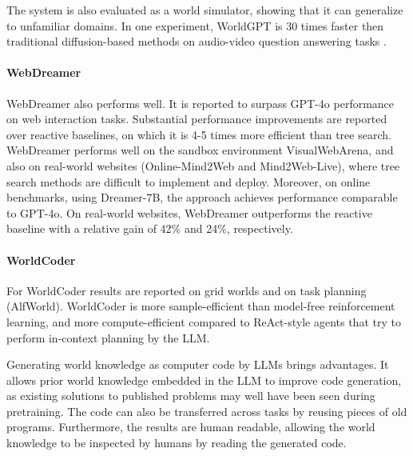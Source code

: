 The system is also evaluated as a world simulator, showing that %
it can generalize to unfamiliar domains.
In one experiment, WorldGPT is 30 times faster then traditional diffusion-based methods  on audio-video question answering
tasks \citep{ge2024worldgpt}.

\paragraph{WebDreamer} WebDreamer also performs well. It is reported to surpass GPT-4o performance on web interaction tasks.
Substantial performance improvements are reported over reactive baselines, on which it is 4-5 times more efficient than tree search. WebDreamer performs well  on the sandbox environment VisualWebArena, and also on real-world websites (Online-Mind2Web and Mind2Web-Live), where tree search methods are difficult to implement and deploy. Moreover, on online benchmarks, using Dreamer-7B, the approach achieves performance
comparable to GPT-4o. On real-world websites, WebDreamer
outperforms the reactive baseline with a relative gain of 42\% and 24\%, respectively. %

\paragraph{WorldCoder} 
For WorldCoder  results are reported on grid worlds and on task planning (AlfWorld). WorldCoder is more sample-efficient than model-free reinforcement learning, and more compute-efficient compared to ReAct-style agents that try to perform in-context planning by the LLM. %


Generating world knowledge as computer code by LLMs brings
advantages. It allows prior world knowledge embedded in the LLM to improve code generation, as existing solutions to published problems may well have been seen during pretraining. The code can also be transferred across tasks by reusing pieces of old programs. Furthermore, the results are human readable, allowing the world knowledge to be inspected by humans by reading the generated code.

